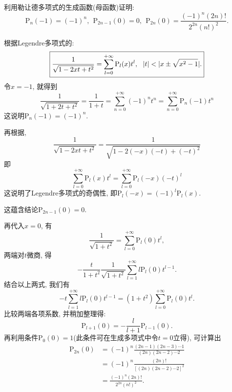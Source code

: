 \begin{yyEx}
	利用勒让德多项式的生成函数(母函数)证明:\begin{equation*}
		\mathrm{P}_n(-1) = (-1)^n,~~\mathrm{P}_{2n-1}(0) = 0,~~\mathrm{P}_{2n}(0) = \frac{(-1)^n(2n)!}{2^{2n}(n!)^2}.
	\end{equation*}
\end{yyEx}

\begin{yyProof}
	根据Legendre多项式的:
	\begin{equation*}
		\boxed{
			\frac{1}{\sqrt{1-2xt+t^2}} = \sum_{l = 0}^{+\infty}\mathrm{P}_l(x)t^l,~~\lvert t\rvert<\lvert x\pm \sqrt{x^2-1}\rvert.
		}
	\end{equation*}
	令$x = -1$, 就得到
	\begin{equation*}
		\frac{1}{\sqrt{1+2t+t^2}} = \frac{1}{1+t} = \sum_{n=0}^{+\infty}(-1)^nt^n = \sum_{n = 0}^{+\infty}\mathrm{P}_n(-1)t^n
	\end{equation*}
	这说明$\mathrm{P}_n(-1) = (-1)^n$.
	
	再根据,
	\begin{equation*}
		\frac{1}{\sqrt{1-2xt+t^2}} = \frac{1}{\sqrt{1-2(-x)(-t)+(-t)^2}}
	\end{equation*}
	即\begin{equation*}
		\sum_{l = 0}^{+\infty}\mathrm{P}_l(x)t^l = \sum_{l = 0}^{+\infty}\mathrm{P}_l(-x)(-t)^l
	\end{equation*}
	这说明了Legendre多项式的奇偶性, 即$\mathrm{P}_l(-x) = (-1)^l\mathrm{P}_l(x)$.
	
	这蕴含结论$\mathrm{P}_{2n-1}(0) = 0$.
	
	再代入$x = 0$, 有\begin{equation*}
		\frac{1}{\sqrt{1+t^2}} = \sum_{l = 0}^{+\infty}\mathrm{P}_l(0)t^l,
	\end{equation*}
	两端对$t$微商, 得\begin{equation*}
		-\frac{t}{1+t^2}\frac{1}{\sqrt{1+t^2}}\sum_{l = 1}^{+\infty}l\mathrm{P}_l(0)t^{l-1}.
	\end{equation*}
	结合以上两式, 我们有
	\begin{equation*}
		-t\sum_{l = 1}^{+\infty}l\mathrm{P}_l(0)t^{l-1} = (1+t^2)\sum_{l = 0}^{+\infty}\mathrm{P}_l(0)t^l.
	\end{equation*}
	比较两端各项系数, 并稍加整理得:
	\begin{equation*}
		\mathrm{P}_{l+1}(0) = -\frac{l}{l+1}\mathrm{P}_{l-1}(0).
	\end{equation*}
	再利用条件$\mathrm{P}_0(0) = 1$(此条件可在生成多项式中令$t = 0$立得), 可计算出\begin{equation*}
		\begin{split}
			\mathrm{P}_{2n}(0) &= (-1)^n\frac{(2n-1)(2n-3)\cdots 1}{(2n)(2n-2)\cdots 2}\\
			&= (-1)^n\frac{(2n)!}{[(2n)(2n-2)\cdots 2]^2} \\
			&=\frac{(-1)^n(2n)!}{2^{2n}(n!)^2}.
		\end{split}
	\end{equation*}
\end{yyProof}

